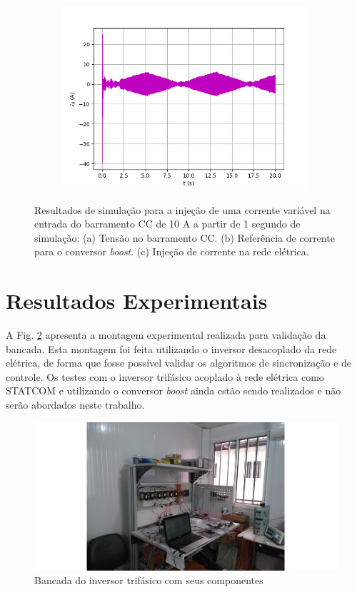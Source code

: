 \begin{figure}[!hbt]
\begin{subfigure}[b]{0.49\textwidth}
		\includegraphics[width=\textwidth]{figuras/sim_figures/inversor_e_boost_variavel/injecao_corrente.png}
		\caption{}
	\end{subfigure}
	\caption{Resultados de simulação para a injeção de uma corrente variável na entrada do barramento CC de 10 A a partir de 1 segundo de simulação: (a) Tensão no barramento CC. (b) Referência de corrente para o conversor \textit{boost}. (c) Injeção de corrente na rede elétrica.}
    \label{fig:sim-controle-corrente}
\end{figure}

\section{Resultados Experimentais}

A Fig. \ref{fig:res-bancada-inversor} apresenta a montagem experimental realizada para validação da bancada.
Esta montagem foi feita utilizando o inversor desacoplado da rede elétrica, de forma que fosse possível validar
os algoritmos de sincronização e de controle. Os testes com o inversor trifásico acoplado à rede elétrica como STATCOM e
utilizando o conversor \textit{boost} ainda estão sendo realizados e não serão abordados neste trabalho.

\begin{figure}[!hbt]
	\begin{center}
    \includegraphics[width=\textwidth]{figuras/resultados-montagem-laboratorial.png}
    \caption{Bancada do inversor trifásico com seus componentes}
    \label{fig:res-bancada-inversor}
    \end{center}
\end{figure}

